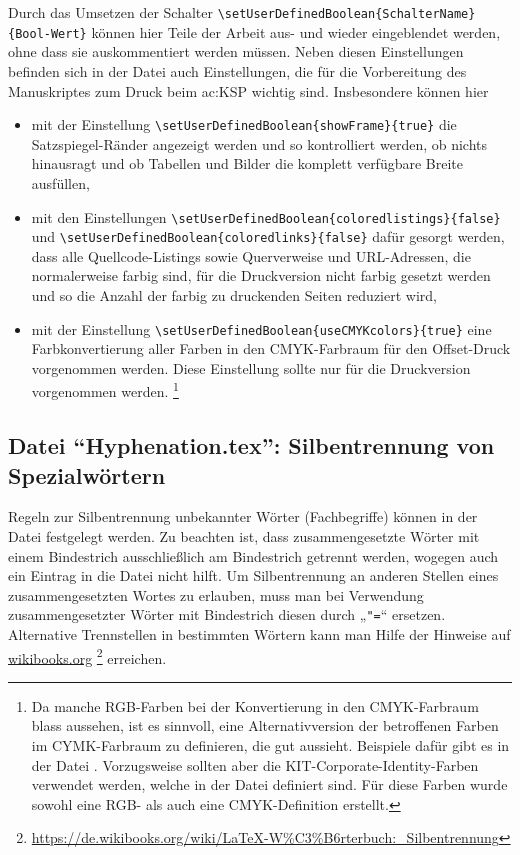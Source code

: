 Durch das Umsetzen der Schalter 
\lstinline|\setUserDefinedBoolean{SchalterName}{Bool-Wert}| 
können hier Teile der Arbeit aus- und wieder eingeblendet werden, ohne dass sie auskommentiert werden müssen.
Neben diesen Einstellungen befinden sich in der Datei  auch Einstellungen,
die für die Vorbereitung des Manuskriptes zum Druck beim \gls{ac:KSP} wichtig sind.
Insbesondere können hier
\begin{itemize}
\item mit der Einstellung
\lstinline|\setUserDefinedBoolean{showFrame}{true}|
die Satzspiegel-Ränder angezeigt werden und so kontrolliert werden,
ob nichts hinausragt und ob Tabellen und Bilder die komplett verfügbare Breite ausfüllen,
\item mit den Einstellungen
\lstinline|\setUserDefinedBoolean{coloredlistings}{false}| und 
\lstinline|\setUserDefinedBoolean{coloredlinks}{false}|
dafür gesorgt werden, dass alle Quellcode-Listings sowie Querverweise und URL-Adressen,
die normalerweise farbig sind, für die Druckversion nicht farbig gesetzt werden
und so die Anzahl der farbig zu druckenden Seiten reduziert wird,
\item mit der Einstellung
\lstinline|\setUserDefinedBoolean{useCMYKcolors}{true}|
eine Farbkonvertierung aller Farben in den CMYK-Farbraum für den Offset-Druck vorgenommen werden.
Diese Einstellung sollte nur für die Druckversion vorgenommen werden.%
\footnote{Da manche RGB-Farben bei der Konvertierung in den CMYK-Farbraum blass aussehen,
ist es sinnvoll, eine Alternativversion der betroffenen Farben im CYMK-Farbraum zu definieren,
die gut aussieht.
Beispiele dafür gibt es in der Datei .
Vorzugsweise sollten aber die KIT-Corporate-Identity-Farben verwendet werden,
welche in der Datei  definiert sind.
Für diese Farben wurde sowohl eine RGB- als auch eine CMYK-Definition erstellt.}
\end{itemize}

\subsection[Datei \enquote{Hyphenation.tex}: Silbentrennung von Spezialwörtern]{Datei \enquote{Hyphenation.tex}: Silbentrennung von Spezialwörtern}%
%
\label{sec:Hyphenation}
%
Regeln zur Silbentrennung unbekannter Wörter (\zB Fachbegriffe)
können in der Datei  festgelegt werden.
Zu beachten ist, dass zusammengesetzte Wörter mit einem Bindestrich
ausschließlich am Bindestrich getrennt werden,
wogegen auch ein Eintrag in die Datei  nicht hilft.
Um Silbentrennung an anderen Stellen eines zusammengesetzten Wortes zu erlauben,
muss man bei Verwendung zusammengesetzter Wörter mit Bindestrich diesen durch „\verb+"=+“ ersetzen.
Alternative Trennstellen in bestimmten Wörtern kann man Hilfe der Hinweise auf 
\href{https://de.wikibooks.org/wiki/LaTeX-W%C3%B6rterbuch:_Silbentrennung}{wikibooks.org}%
\footnote{\url{https://de.wikibooks.org/wiki/LaTeX-W%C3%B6rterbuch:_Silbentrennung}}
erreichen.


